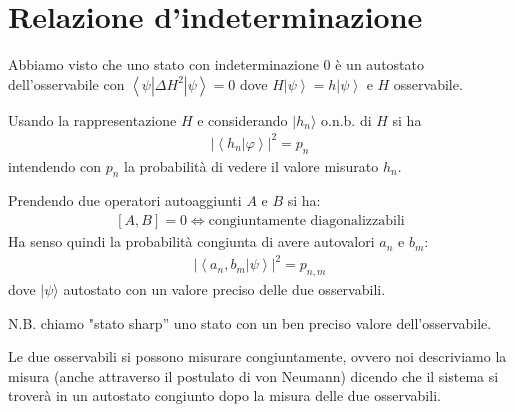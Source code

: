 %
%
%
%


\section{Relazione d'indeterminazione} %
Abbiamo visto che uno stato con indeterminazione 0 è un autostato dell'osservabile con $\left\langle \psi |\Delta H^2|\psi  \right\rangle=0$ dove $H\left |\psi  \right\rangle=h\left |\psi  \right\rangle$ e $H$ osservabile.

Usando la rappresentazione $H$ e considerando $ |h_n\rangle$ o.n.b. di $H$ si ha
\begin{equation}\begin{split}
|\left\langle h_n|\varphi  \right\rangle|^2=p_n
\end{split}\end{equation}
intendendo con $p_n$ la probabilità di vedere il valore misurato $h_n$.

Prendendo due operatori autoaggiunti $A$ e $B$ si ha:
\begin{equation}\begin{split}
\left[A,B\right] =0 \Longleftrightarrow \textrm{congiuntamente diagonalizzabili}
\end{split}\end{equation}
Ha senso quindi la probabilità congiunta di avere autovalori $a_n$ e $b_m$:
\begin{equation}\begin{split}
|\left\langle a_n,b_m|\psi  \right\rangle|^2=p_{n,m}
\end{split}\end{equation}
dove $|\psi\rangle$ autostato con un valore preciso delle due osservabili.

N.B. chiamo "stato sharp'' uno stato con un ben preciso valore dell'osservabile.

Le due osservabili si possono misurare congiuntamente, ovvero noi descriviamo la misura (anche attraverso il postulato di von Neumann) dicendo che il sistema si troverà in un autostato congiunto dopo la misura delle due osservabili.


